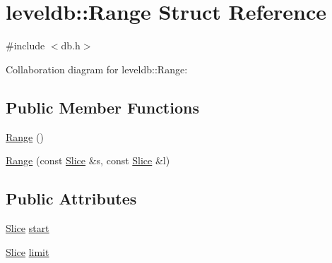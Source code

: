 \hypertarget{structleveldb_1_1_range}{\section{leveldb\-:\-:Range Struct Reference}
\label{structleveldb_1_1_range}
}


{\ttfamily \#include $<$db.\-h$>$}



Collaboration diagram for leveldb\-:\-:Range\-:
\subsection*{Public Member Functions}
\begin{DoxyCompactItemize}
\item 
\hyperlink{structleveldb_1_1_range_af73eb85edfde053ebc456cb08f4d3ec1}{Range} ()
\item 
\hyperlink{structleveldb_1_1_range_a797d5e3b58cc615dfb805965d06bdcbf}{Range} (const \hyperlink{classleveldb_1_1_slice}{Slice} \&s, const \hyperlink{classleveldb_1_1_slice}{Slice} \&l)
\end{DoxyCompactItemize}
\subsection*{Public Attributes}
\begin{DoxyCompactItemize}
\item 
\hyperlink{classleveldb_1_1_slice}{Slice} \hyperlink{structleveldb_1_1_range_ad80a55e20eb7d864d497e8f94953c00d}{start}
\item 
\hyperlink{classleveldb_1_1_slice}{Slice} \hyperlink{structleveldb_1_1_range_a9c45c46ac20a1c86c265f1f9c35d6632}{limit}
\end{DoxyCompactItemize}


